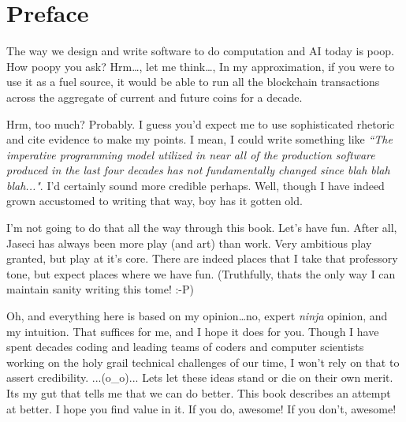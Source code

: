 \chapter*{Preface}

The way we design and write software to do computation and AI today is poop. How poopy you ask? Hrm\dots, let me think\dots, In my approximation, if you were to use it as a fuel source, it would be able to run all the blockchain transactions across the aggregate of current and future coins for a decade.
\par
Hrm, too much? Probably. I guess you'd expect me to use sophisticated rhetoric and cite evidence to make my points. I mean, I could write something like \textit{``The imperative programming model utilized in near all of the production software produced in the last four decades has not fundamentally changed since blah blah blah..."}. I'd certainly sound more credible perhaps. Well, though I have indeed grown accustomed to writing that way, boy has it gotten old.
\par
I'm not going to do that all the way through this book. Let's have fun. After all, Jaseci has always been more play (and art) than work. Very ambitious play granted, but play at it's core. There are indeed places that I take that professory tone, but expect places where we have fun. (Truthfully, thats the only way I can maintain sanity writing this tome! :-P)
\par
Oh, and everything here is based on my opinion\dots no, expert \emph{ninja} opinion, and my intuition. That suffices for me, and I hope it does for you. Though I have spent decades coding and leading teams of coders and computer scientists working on the holy grail technical challenges of our time, I won't rely on that to assert credibility. ...(o\_o)... Lets let these ideas stand or die on their own merit. Its my gut that tells me that we can do better. This book describes an attempt at better. I hope you find value in it. If you do, awesome! If you don't, awesome!
